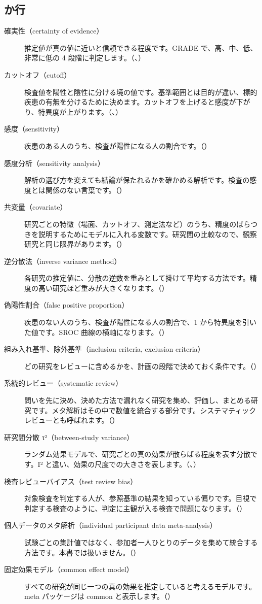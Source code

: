 \subsection*{か行}
\begin{description}
\item[確実性（certainty of evidence）] 推定値が真の値に近いと信頼できる程度です。GRADE で、高、中、低、非常に低の 4 段階に判定します。（、）
\item[カットオフ（cutoff）] 検査値を陽性と陰性に分ける境の値です。基準範囲とは目的が違い、標的疾患の有無を分けるために決めます。カットオフを上げると感度が下がり、特異度が上がります。（、）
\item[感度（sensitivity）] 疾患のある人のうち、検査が陽性になる人の割合です。（）
\item[感度分析（sensitivity analysis）] 解析の選び方を変えても結論が保たれるかを確かめる解析です。検査の感度とは関係のない言葉です。（）
\item[共変量（covariate）] 研究ごとの特徴（場面、カットオフ、測定法など）のうち、精度のばらつきを説明するためにモデルに入れる変数です。研究間の比較なので、観察研究と同じ限界があります。（）
\item[逆分散法（inverse variance method）] 各研究の推定値に、分散の逆数を重みとして掛けて平均する方法です。精度の高い研究ほど重みが大きくなります。（）
\item[偽陽性割合（false positive proportion）] 疾患のない人のうち、検査が陽性になる人の割合で、1 から特異度を引いた値です。SROC 曲線の横軸になります。（）
\item[組み入れ基準、除外基準（inclusion criteria, exclusion criteria）] どの研究をレビューに含めるかを、計画の段階で決めておく条件です。（）
\item[系統的レビュー（systematic review）] 問いを先に決め、決めた方法で漏れなく研究を集め、評価し、まとめる研究です。メタ解析はその中で数値を統合する部分です。システマティックレビューとも呼ばれます。（）
\item[研究間分散 τ²（between-study variance）] ランダム効果モデルで、研究ごとの真の効果が散らばる程度を表す分散です。I² と違い、効果の尺度での大きさを表します。（、）
\item[検査レビューバイアス（test review bias）] 対象検査を判定する人が、参照基準の結果を知っている偏りです。目視で判定する検査のように、判定に主観が入る検査で問題になります。（）
\item[個人データのメタ解析（individual participant data meta-analysis）] 試験ごとの集計値ではなく、参加者一人ひとりのデータを集めて統合する方法です。本書では扱いません。（）
\item[固定効果モデル（common effect model）] すべての研究が同じ一つの真の効果を推定していると考えるモデルです。meta パッケージは common と表示します。（）
\end{description}

